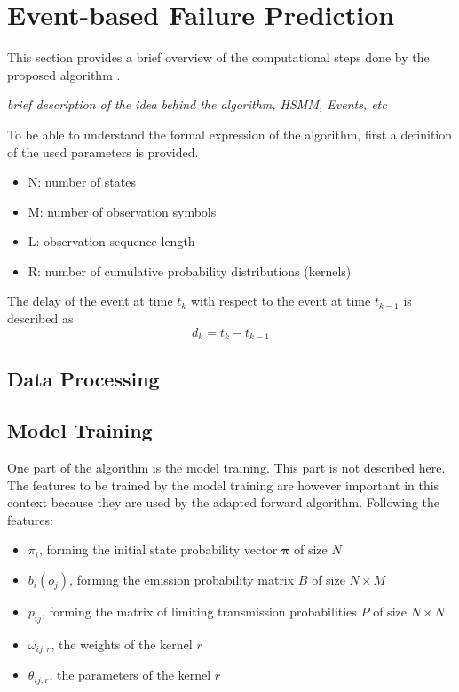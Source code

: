 \documentclass[mscthesis]{usiinfthesis}
\begin{document}
\chapter{Event-based Failure Prediction}
\label{ch:event}

This section provides a brief overview of the computational steps done by the
proposed algorithm \cite{salfner08}.

\emph{\color{red}brief description of the idea behind the algorithm, HSMM, Events, etc}

To be able to understand the formal expression of the algorithm, first
a definition of the used parameters is provided.
\begin{itemize}
    \item N: number of states
    \item M: number of observation symbols
    \item L: observation sequence length
    \item R: number of cumulative probability distributions (kernels)
\end{itemize}
The delay of the event at time $ t_k $ with respect to the event at time
$ t_{k-1} $ is described as
\begin{equation}
    d_k = t_k-t_{k-1}
\end{equation}

\section{Data Processing}
\label{ch:event_data}

\section{Model Training}
\label{ch:event_train}

One part of the algorithm is the model training. This part is not described
here. The features to be trained by the model training are however important
in this context because they are used by the adapted forward algorithm.
Following the features:
\begin{itemize}
    \item $ \pi_i $, forming the initial state probability vector
        $ \boldsymbol{\pi} $ of size $ N $
    \item $ b_i(o_j) $, forming the emission probability matrix $ B $ of size
        $ N \times M $
    \item $ p_{ij} $, forming the matrix of limiting transmission probabilities
        $ P $ of size $ N \times N $
    \item $ \omega_{ij, r} $, the weights of the kernel $ r $
    \item $ \theta_{ij, r} $, the parameters of the kernel $ r $
\end{itemize}
\end{document}

